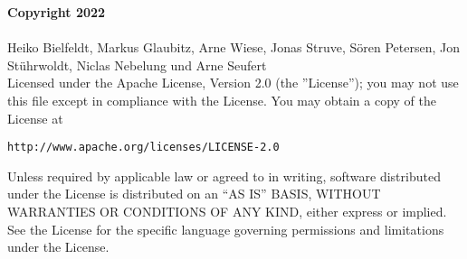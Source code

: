 
\textbf{Copyright	2022}\\\\
Heiko Bielfeldt, Markus Glaubitz, Arne Wiese, Jonas Struve, Sören Petersen, Jon Stührwoldt, Niclas Nebelung und Arne Seufert\\
Licensed	under	the	Apache	License,	Version	2.0	(the	”License”);	you	may	not	use	this	file	except	in
compliance	with	the	License.	You	may	obtain	a copy of	the	License	at\\
\begin{verbatim}
http://www.apache.org/licenses/LICENSE-2.0
\end{verbatim}
Unless	required	by	applicable	law	or	agreed	to	in	writing,	software	distributed	under	the	License	is
distributed	on	an	“AS	IS”	BASIS,	WITHOUT	WARRANTIES	OR	CONDITIONS	OF	ANY	KIND,	either	express
or	implied.	See	the	License	for	the	specific	language	governing	permissions	and	limitations	under	the
License.